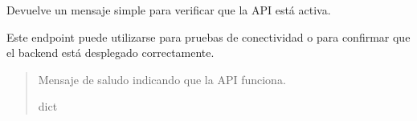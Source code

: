 \documentclass[letterpaper,10pt,spanish]{sphinxmanual}
\begin{document}
\begin{fulllineitems}
\label{\detokenize{modelos:main.saludo}}
\pysigstartsignatures
\pysiglinewithargsret
{}
{}
{}
\pysigstopsignatures
\sphinxAtStartPar
Devuelve un mensaje simple para verificar que la API está activa.

\sphinxAtStartPar
Este endpoint puede utilizarse para pruebas de conectividad o para confirmar que el backend está desplegado correctamente.
\begin{quote}\begin{description}
\sphinxAtStartPar
Mensaje de saludo indicando que la API funciona.

\sphinxAtStartPar
dict

\end{description}\end{quote}

\end{fulllineitems}

\end{document}
